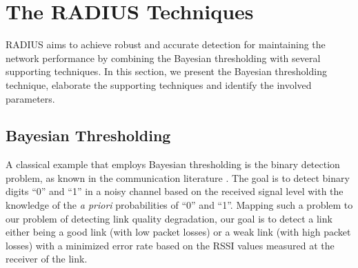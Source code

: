 \section{The RADIUS Techniques}\label{sec:approach} 

RADIUS aims to achieve robust and accurate detection for maintaining the network performance by combining the Bayesian thresholding with several supporting techniques. 
In this section, we present the Bayesian thresholding technique, elaborate the supporting techniques and identify the involved parameters. 


\subsection{Bayesian Thresholding} \label{sec:thdComputation}

A classical example that employs Bayesian thresholding is the binary detection problem, as known in the communication literature \cite{lee2012digital}. The goal is to detect binary digits ``0'' and ``1'' in a noisy channel based on the received signal level with the knowledge of the \textit{a priori} probabilities of ``0'' and ``1''. Mapping such a problem to our problem of detecting link quality degradation, our goal is to detect a link either being a good link (with low packet losses) or a weak link (with high packet losses) with a minimized error rate based on the RSSI values measured at the receiver of the link.

